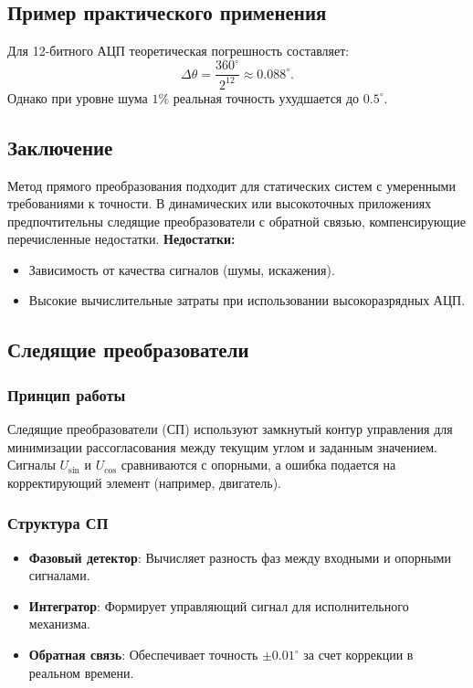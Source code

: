 \subsection{Пример практического применения}
Для 12-битного АЦП теоретическая погрешность составляет:
\[
\Delta\theta = \frac{360^\circ}{2^{12}} \approx 0.088^\circ.
\]
Однако при уровне шума \(1\%\) реальная точность ухудшается до \(0.5^\circ\).

\subsection{Заключение}
Метод прямого преобразования подходит для статических систем с умеренными требованиями к точности. В динамических или высокоточных приложениях предпочтительны следящие преобразователи с обратной связью, компенсирующие перечисленные недостатки.
\textbf{Недостатки:}
\begin{itemize}
    \item Зависимость от качества сигналов (шумы, искажения).
    \item Высокие вычислительные затраты при использовании высокоразрядных АЦП.
\end{itemize}

\subsection{Следящие преобразователи}
\cite{Safronov}
\subsubsection*{Принцип работы}
Следящие преобразователи (СП) используют замкнутый контур управления для минимизации рассогласования между текущим углом и заданным значением. Сигналы \(U_{\sin}\) и \(U_{\cos}\) сравниваются с опорными, а ошибка подается на корректирующий элемент (например, двигатель).

\subsubsection*{Структура СП}
\begin{itemize}
    \item \textbf{Фазовый детектор}: Вычисляет разность фаз между входными и опорными сигналами.
    \item \textbf{Интегратор}: Формирует управляющий сигнал для исполнительного механизма.
    \item \textbf{Обратная связь}: Обеспечивает точность \(\pm0.01^\circ\) за счет коррекции в реальном времени.
\end{itemize}

